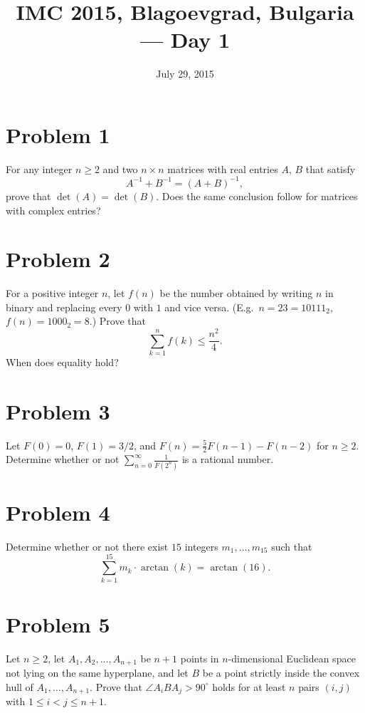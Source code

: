 \documentclass{article}
\title{IMC 2015, Blagoevgrad, Bulgaria --- Day 1}
\date{July 29, 2015}
\begin{document}
\maketitle

\section*{Problem 1}
For any integer $n \ge 2$ and two $n \times n$ matrices with real entries $A$, $B$ that satisfy
\[ A^{-1} + B^{-1} = (A+B)^{-1}, \]
prove that $\det(A) = \det(B)$. Does the same conclusion follow for matrices with complex entries?

\section*{Problem 2}
For a positive integer $n$, let $f(n)$ be the number obtained by writing $n$ in binary and replacing every $0$ with $1$ and vice versa. (E.g.\ $n = 23 = 10111_2$, $f(n) = 1000_2 = 8$.) Prove that
\[ \sum_{k=1}^n f(k) \le \frac{n^2}{4}. \]
When does equality hold?

\section*{Problem 3}
Let $F(0) = 0$, $F(1) = 3/2$, and $F(n) = \tfrac{5}{2} F(n-1) - F(n-2)$ for $n \ge 2$. Determine whether or not $\sum_{n=0}^\infty \frac{1}{F(2^n)}$ is a rational number.

\section*{Problem 4}
Determine whether or not there exist $15$ integers $m_1, \dots, m_{15}$ such that
\[ \sum_{k=1}^{15} m_k \cdot \arctan(k) = \arctan(16). \]

\section*{Problem 5}
Let $n \ge 2$, let $A_1, A_2, \dots, A_{n+1}$ be $n+1$ points in $n$-dimensional Euclidean space not lying on the same hyperplane, and let $B$ be a point strictly inside the convex hull of $A_1, \dots, A_{n+1}$. Prove that $\angle A_i B A_j > 90^\circ$ holds for at least $n$ pairs $(i,j)$ with $1 \le i < j \le n+1$.
\end{document}
